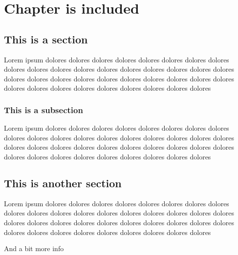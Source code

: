 \chapter{Chapter is included}
\label{chap:included}

\section{This is a section}
\label{sec:section}

Lorem ipsum dolores dolores dolores dolores dolores dolores dolores dolores dolores dolores dolores dolores dolores dolores dolores dolores dolores dolores dolores dolores dolores dolores dolores dolores dolores dolores dolores dolores dolores dolores dolores dolores dolores dolores dolores dolores dolores 

\subsection{This is a subsection}
\label{subsec:subsection}
Lorem ipsum dolores dolores dolores dolores dolores dolores dolores dolores dolores dolores dolores dolores dolores dolores dolores dolores dolores dolores dolores dolores dolores dolores dolores dolores dolores dolores dolores dolores dolores dolores dolores dolores dolores dolores dolores dolores dolores 

\section{This is another section}
\label{sec:another}
Lorem ipsum dolores dolores dolores dolores dolores dolores dolores dolores dolores dolores dolores dolores dolores dolores dolores dolores dolores dolores dolores dolores dolores dolores dolores dolores dolores dolores dolores dolores dolores dolores dolores dolores dolores dolores dolores dolores dolores 

And a bit more info